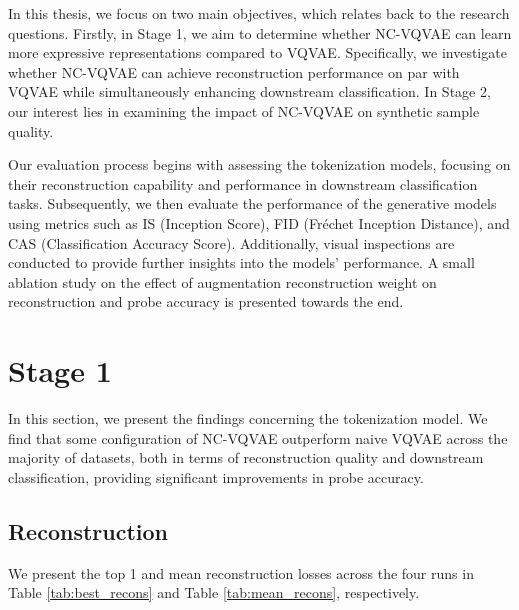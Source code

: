 \documentclass[../../thesis.tex]{subfiles}
\begin{document}
In this thesis, we focus on two main objectives, which relates back to the research questions. Firstly, in Stage 1, we aim to determine whether NC-VQVAE can learn more expressive representations compared to VQVAE. Specifically, we investigate whether NC-VQVAE can achieve reconstruction performance on par with VQVAE while simultaneously enhancing downstream classification. In Stage 2, our interest lies in examining the impact of NC-VQVAE on synthetic sample quality.\newline

Our evaluation process begins with assessing the tokenization models, focusing on their reconstruction capability and performance in downstream classification tasks. Subsequently, we then evaluate the performance of the generative models using metrics such as IS (Inception Score), FID (Fréchet Inception Distance), and CAS (Classification Accuracy Score). Additionally, visual inspections are conducted to provide further insights into the models' performance. A small ablation study on the effect of augmentation reconstruction weight on reconstruction and probe accuracy is presented towards the end.

\section{Stage 1}


In this section, we present the findings concerning the tokenization model. We find that some configuration of NC-VQVAE outperform naive VQVAE across the majority of datasets, both in terms of reconstruction quality and downstream classification, providing significant improvements in probe accuracy. 

\subsection{Reconstruction}

We present the top 1 and mean reconstruction losses across the four runs in Table \ref{tab:best_recons} and Table \ref{tab:mean_recons}, respectively.
\end{document}

